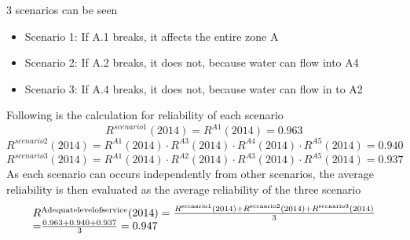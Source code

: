 3 scenarios can be seen

\begin{itemize}
	\item Scenario 1: If A.1 breaks, it affects the entire zone A
	\item Scenario 2: If A.2 breaks, it does not, because water can flow into A4
	\item Scenario 3: If A.4 breaks, it does not, because water can flow in to A2
\end{itemize}
Following is the calculation for reliability of each scenario
\[
 {R^{scenario1}}(2014) = {R^{A1}}(2014) = 0.963
\]
\[
 {R^{scenario2}}(2014) = {R^{A1}}(2014) \cdot {R^{A3}}(2014) \cdot
{R^{A4}}(2014) \cdot {R^{A5}}(2014) = 0.940
\]
\[
 {R^{scenario3}}(2014) = {R^{A1}}(2014) \cdot {R^{A2}}(2014) \cdot
{R^{A3}}(2014) \cdot {R^{A5}}(2014) = 0.937
\]
As each scenario can occurs independently from other scenarios, the average
reliability is then evaluated as the average reliability of the three scenario
\[
\begin{array}{l}
{R^{{\rm{Adequate level of service}}}}(2014) = \frac{{{R^{{\rm{scenario
1}}}}(2014) + {R^{{\rm{scenario 2}}}}(2014) + {R^{{\rm{scenario
3}}}}(2014)}}{3}\\
{\rm{                                         =  }}\frac{{0.963 + 0.940 +
0.937}}{3} = 0.947
\end{array}
\]
